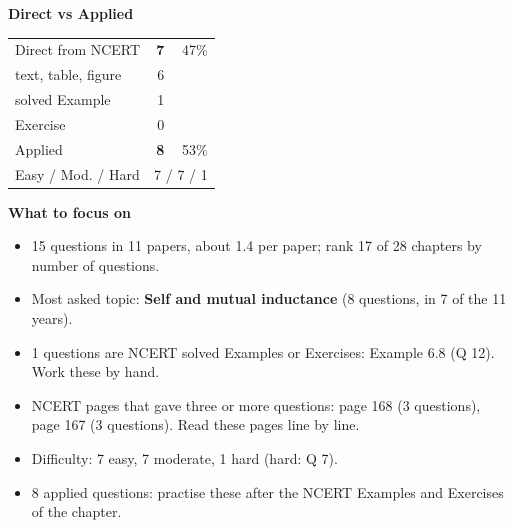 \begin{minipage}[t]{0.34\linewidth}{\small\textbf{\color{crimson}Direct vs Applied}\par\smallskip
\begin{tabular}{@{}lrr@{}}\toprule
Direct from NCERT & \textbf{7} & 47\%\\
\quad text, table, figure & 6 &\\
\quad solved Example & 1 &\\
\quad Exercise & 0 &\\
Applied & \textbf{8} & 53\%\\\midrule
Easy / Mod. / Hard & \multicolumn{2}{r}{7 / 7 / 1}\\\bottomrule
\end{tabular}}\end{minipage}\hfill
\begin{minipage}[t]{0.63\linewidth}{\small\textbf{\color{crimson}What to focus on}\par\smallskip
\begin{itemize}[leftmargin=1.1em,itemsep=1pt,topsep=0pt]
\item 15 questions in 11 papers, about 1.4 per paper; rank 17 of 28 chapters by number of questions.
\item Most asked topic: \textbf{Self and mutual inductance} (8 questions, in 7 of the 11 years).
\item 1 questions are NCERT solved Examples or Exercises: Example 6.8 (Q 12). Work these by hand.
\item NCERT pages that gave three or more questions: page 168 (3 questions), page 167 (3 questions). Read these pages line by line.
\item Difficulty: 7 easy, 7 moderate, 1 hard (hard: Q 7).
\item 8 applied questions: practise these after the NCERT Examples and Exercises of the chapter.
\end{itemize}}\end{minipage}\par
{}
